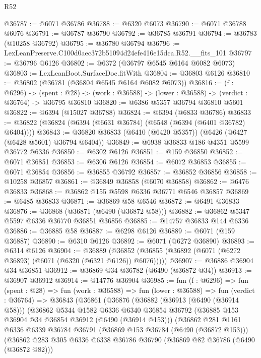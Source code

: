 \begin{lexlean}{R52}
\begin{coremodule}
@36787 := @6071 @36786
@36788 := @6320 @6073
@36790 := @6071 @36788 @6076
@36791 := @36787 @36790
@36792 := @36785 @36791
@36794 := @36783 (@10258 @36792)
@36795 := @36780 @36794
@36796 := LexLeanPreserve.C100d0aec372b51094d24efe416e15dca.R52.__fits_101
@36797 := @36796 @6126
@36802 := @6372 (@36797 @6545 @6164 @6082 @6073)
@36803 := LexLeanBoot.SurfaceDoc.fitWith
@36804 := @36803 @6126
@36810 := @36802 (@36781 (@36804 @6545 @6164 @6082 @6073))
@36816 := (f : @6296) ->
  (spent : @28) -> (work : @36588) -> (lower : @36588) -> (verdict : @36764) -> @36795 @36810
@36820 := @6386 @5357 @36794 @36810 @5601
@36822 := @6394 (@15027 @36788)
@36824 := @6394 (@6833 @36786)
@36833 := @36822 (@36824 (@6394 (@6631 @36784) (@6548 (@6394 (@6401 @36782) @6404))))
@36843 := @36820 @36833 (@6410 (@6420 @5357)) (@6426 (@6427 (@6428 @5601) @36794 @6404))
@36849 := @6938 @36833 @186 @4351 @5599 @36772 @6336
@36850 := @6302 @6126
@36851 := @159 @36850
@36852 := @6071 @36851
@36853 := @6306 @6126
@36854 := @6072 @36853
@36855 := @6071 @36854
@36856 := @36855 @36792
@36857 := @36852 @36856
@36858 := @10258 @36857
@36861 := @36849 @36858 (@6070 @36858)
@36862 := @6476 @36833
@36868 := @36862 @155 @5598 @6336 @36771 @6546 @36857
@36869 := @6485 @36833
@36871 := @36869 @58 @6546
@36872 := @6491 @36833
@36876 := @36868 (@36871 (@6490 (@36872 @58)))
@36882 := @36862 @5347 @5597 @6336 @36770 @36851 @36856
@36885 := @14757 @36833 @144 @6336
@36886 := @36885 @58
@36887 := @6298 @6126
@36889 := @6071 (@159 @36887)
@36890 := @6310 @6126
@36892 := @6071 (@6272 @36890)
@36893 := @6314 @6126
@36904 := @36889
    (@36852 (@36855 (@36892 (@6071 (@6272 @36893) (@6071 (@6320 (@6321 @6126)) @6076)))))
@36907 := @36886 @36904 @34 @36851
@36912 := @36869 @34 @36782 (@6490 (@36872 @34))
@36913 := @36907 @36912
@36914 := @14776 @36904
@36985 := fun (f : @6296) =>
  fun (spent : @28) =>
  fun (work : @36588) =>
  fun (lower : @36588) =>
  fun (verdict : @36764) =>
  @36843
    (@36861
      (@36876
        (@36882
          (@36913 (@6490 (@36914 @58)))
          (@36862
            @5344
            @1582
            @6336
            @6340
            @36854
            @36792
            (@36885 @153 @36904 @34 @36854 @36912 (@6490 (@36914 @153)))
            (@36862
              @281
              @1161
              @6336
              @6339
              @36784
              @36791
              (@36869 @153 @36784 (@6490 (@36872 @153)))
              (@36862
                @283
                @305
                @6336
                @6338
                @36786
                @36790
                (@36869 @82 @36786 (@6490 (@36872 @82)))

\end{coremodule}
\end{lexlean}

